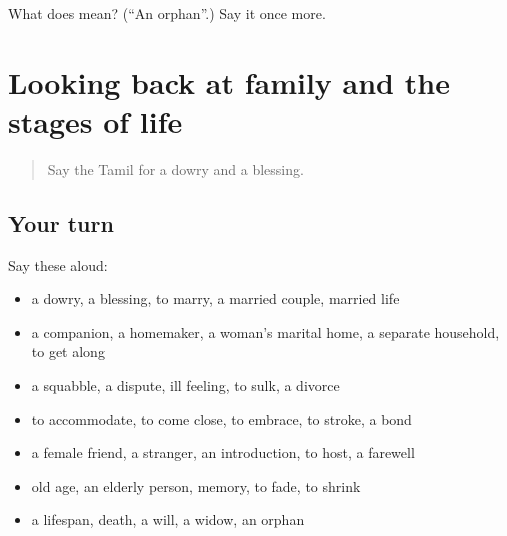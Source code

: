 \begin{tcolorbox}[breakable,colback=teal!4,colframe=teal!35!black,title={Before you move on}]
What does  mean? (\textquotedblleft{}An orphan\textquotedblright{}.) Say it once more.
\end{tcolorbox}
\section[(dialogue)]{Looking back at family and the stages of life}

\label{lesson:TA-R505-review-499-505}



\begin{quote}
Say the Tamil for a dowry and a blessing.
\end{quote}

\subsection*{Your turn}
Say these aloud:

\begin{itemize}
\raggedright
  \item a dowry, a blessing, to marry, a married couple, married life
  \item a companion, a homemaker, a woman’s marital home, a separate household, to get along
  \item a squabble, a dispute, ill feeling, to sulk, a divorce
  \item to accommodate, to come close, to embrace, to stroke, a bond
  \item a female friend, a stranger, an introduction, to host, a farewell
  \item old age, an elderly person, memory, to fade, to shrink
  \item a lifespan, death, a will, a widow, an orphan
\end{itemize}

